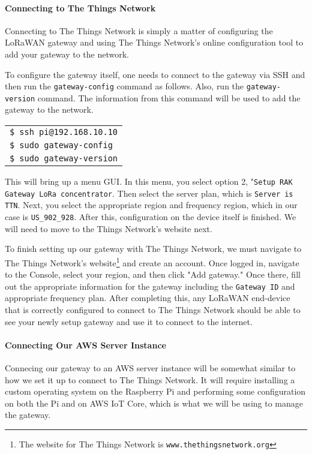 \paragraph{Connecting to The Things Network}
Connecting to The Things Network is simply a matter of configuring the LoRaWAN gateway and using The Things Network's online configuration tool to add your gateway to the network.

To configure the gateway itself, one needs to connect to the gateway via SSH and then run the \texttt{gateway-config} command as follows. Also, run the \texttt{gateway-version} command. The information from this command will be used to add the gateway to the network.

\begin{tabular}{l}
     \texttt{\$ ssh pi@192.168.10.10} \\
     \texttt{\$ sudo gateway-config} \\
     \texttt{\$ sudo gateway-version} \\ 
\end{tabular}

This will bring up a menu GUI. In this menu, you select option 2, "\texttt{Setup RAK Gateway LoRa concentrator}. Then select the server plan, which is \texttt{Server is TTN}. Next, you select the appropriate region and frequency region, which in our case is \texttt{US\_902\_928}. After this, configuration on the device itself is finished. We will need to move to the Things Network's website next.

To finish setting up our gateway with The Things Network, we must navigate to The Things Network's website\footnote{The website for The Things Network is \texttt{www.thethingsnetwork.org}} and create an account. Once logged in, navigate to the Console, select your region, and then click "Add gateway." Once there, fill out the appropriate information for the gateway including the \texttt{Gateway ID} and appropriate frequency plan. After completing this, any LoRaWAN end-device that is correctly configured to connect to The Things Network should be able to see your newly setup gateway and use it to connect to the internet.


\paragraph{Connecting Our AWS Server Instance}
Connecing our gateway to an AWS server instance will be somewhat similar to how we set it up to connect to The Things Network. It will require installing a custom operating system on the Raspberry Pi and performing some configuration on both the Pi and on AWS IoT Core, which is what we will be using to manage the gateway.

